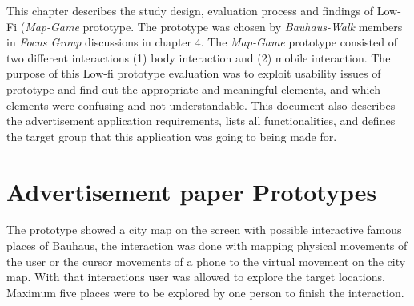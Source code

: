 This chapter describes the study design, evaluation process and findings of Low-Fi (\emph{Map-Game} prototype. The prototype was chosen by \emph{Bauhaus-Walk} members in \emph{Focus Group} discussions in chapter 4.  The \emph{Map-Game} prototype consisted of two different interactions (1) body interaction and (2) mobile interaction. The purpose of this Low-fi prototype evaluation was to exploit usability issues of prototype and find out the appropriate and meaningful elements, and which elements were confusing and not understandable. This document also describes the advertisement application requirements, lists all functionalities, and defines the target group that this application was going to being made for.



\section{Advertisement paper Prototypes}
The prototype showed a city map on the screen with possible interactive famous places of Bauhaus, the interaction was done with mapping physical movements of the user or the cursor movements of a phone to the virtual movement on the city map. With that interactions user was allowed to explore the target locations. Maximum five places were to be explored by one person to finish the interaction.

